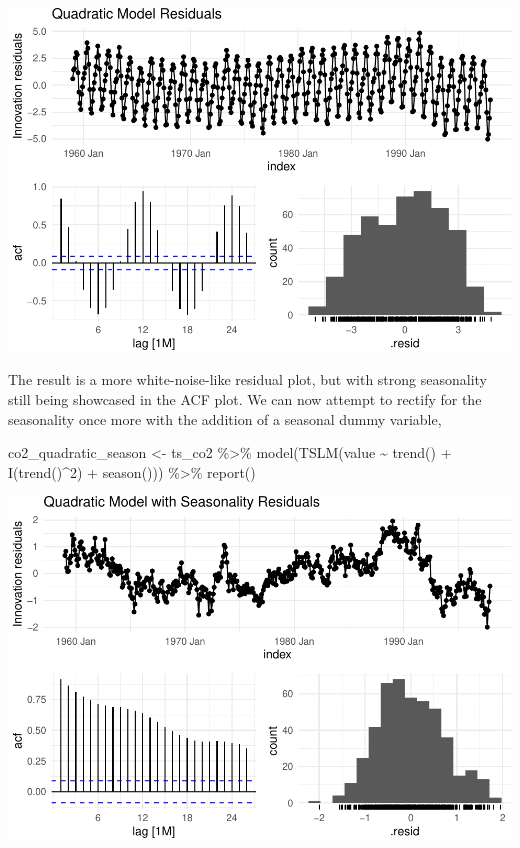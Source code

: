 \documentclass[AER]{AEA}
\newenvironment{Shaded}{\begin{snugshade}}{\end{snugshade}}
\newcommand{\DecValTok}[1]{\textcolor[rgb]{0.00,0.00,0.81}{#1}}
\newcommand{\FunctionTok}[1]{\textcolor[rgb]{0.00,0.00,0.00}{#1}}
\newcommand{\NormalTok}[1]{#1}
\newcommand{\OtherTok}[1]{\textcolor[rgb]{0.56,0.35,0.01}{#1}}
\newcommand{\SpecialCharTok}[1]{\textcolor[rgb]{0.00,0.00,0.00}{#1}}
\begin{document}
\includegraphics{co2_1997_Qian_files/figure-latex/Quad model residuals-1.pdf}

The result is a more white-noise-like residual plot, but with strong
seasonality still being showcased in the ACF plot. We can now attempt to
rectify for the seasonality once more with the addition of a seasonal
dummy variable,

\begin{Shaded}
\begin{Highlighting}[]
\NormalTok{co2\_quadratic\_season }\OtherTok{\textless{}{-}}\NormalTok{ ts\_co2 }\SpecialCharTok{\%\textgreater{}\%} 
    \FunctionTok{model}\NormalTok{(}\FunctionTok{TSLM}\NormalTok{(value }\SpecialCharTok{\textasciitilde{}} \FunctionTok{trend}\NormalTok{() }\SpecialCharTok{+} \FunctionTok{I}\NormalTok{(}\FunctionTok{trend}\NormalTok{()}\SpecialCharTok{\^{}}\DecValTok{2}\NormalTok{) }\SpecialCharTok{+} \FunctionTok{season}\NormalTok{())) }\SpecialCharTok{\%\textgreater{}\%} 
    \FunctionTok{report}\NormalTok{()}
\end{Highlighting}
\end{Shaded}

\includegraphics{co2_1997_Qian_files/figure-latex/Quad model with seasonality residuals-1.pdf}
\end{document}
